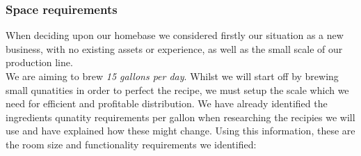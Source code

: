 \documentclass[11pt]{article}
\begin{document}
    \subsubsection{Space requirements}
When deciding upon our homebase we considered firstly our situation as a new business, with no existing assets or experience, as well as the small scale of our production line. \\

\noindent We are aiming to brew \emph{15 gallons per day}. Whilst we will start off by brewing small qunatities in order to perfect the recipe, we must setup the scale which we need for efficient and profitable distribution. We have already identified the ingredients qunatity requirements per gallon when researching the recipies we will use and have explained how these might change. Using this information, these are the room size and functionality requirements we identified: \\
\end{document}
